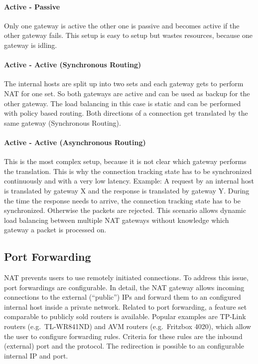 \documentclass{report}
\begin{document}
\paragraph{Active - Passive}

Only one gateway is active the other one is passive and becomes active
if the other gateway fails. This setup is easy to setup but wastes
resources, because one gateway is idling.

\paragraph{Active - Active (Synchronous Routing)}

The internal hosts are split up into two sets and each gateway gets to
perform NAT for one set. So both gateways are active and can be used as
backup for the other gateway. The load balancing in this case is static
and can be performed with policy based routing. Both directions of a
connection get translated by the same gateway (Synchronous Routing).

\paragraph{Active - Active (Asynchronous Routing)}

This is the most complex setup, because it is not clear which gateway
performs the translation. This is why the connection tracking state has
to be synchronized continuously and with a very low latency.
Example: A request by an internal host is translated by gateway X and the response
is translated by gateway Y. During the time the response needs to
arrive, the connection tracking state has to be synchronized. Otherwise
the packets are rejected. This scenario allows dynamic load balancing
between multiple NAT gateways without knowledge which gateway a packet is processed on.


\subsection{Port Forwarding}\label{port-forwarding}

NAT prevents users to use remotely initiated connections. To address
this issue, port forwardings are configurable. In detail, the NAT
gateway allows incoming connections to the external (``public'') IPs
and forward them to an configured internal host inside a private
network. Related to port forwarding, a feature set comparable to
publicly sold routers is available. Popular examples are TP-Link
routers (e.g.~TL-WR841ND\cite{TL-WR}) and AVM routers (e.g.~Fritzbox 4020\cite{fritzbox}), which
allow the user to configure forwarding rules. Criteria for these rules are the
inbound (external) port and the protocol. The redirection is possible to
an configurable internal IP and port.
\end{document}
